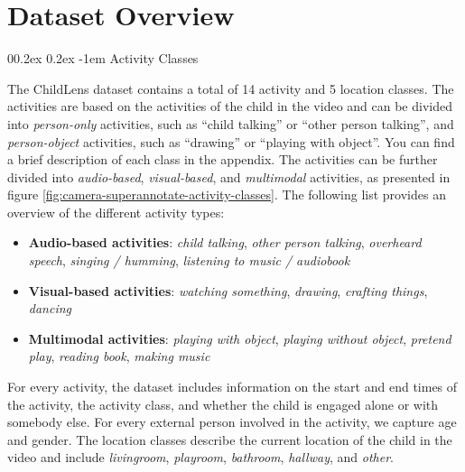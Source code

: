 \documentclass[
  man,floatsintext]{apa6}
\makeatletter
\providecommand{\tightlist}{%
  \setlength{\itemsep}{0pt}\setlength{\parskip}{0pt}}
\let\oldparagraph\paragraph
\renewcommand{\paragraph}{
    \@ifstar
      \xxxParagraphStar
      \xxxParagraphNoStar
  }
\newcommand{\xxxParagraphStar}[1]{\oldparagraph*{#1}\mbox{}}
\newcommand{\xxxParagraphNoStar}[1]{\oldparagraph{#1}\mbox{}}
\renewcommand{\paragraph}{\@startsection{paragraph}{4}{\parindent}%
  {0\baselineskip \@plus 0.2ex \@minus 0.2ex}%
  {-1em}%
  {\normalfont\normalsize\bfseries\itshape\typesectitle}}
\makeatother
\begin{document}
\section{Dataset Overview}\label{dataset-overview}

\paragraph{Activity Classes}\label{activity-classes}

The ChildLens dataset contains a total of 14 activity and 5 location classes. The activities are based on the activities of the child in the video and can be divided into \emph{person-only} activities, such as ``child talking'' or ``other person talking'', and \emph{person-object} activities, such as ``drawing'' or ``playing with object''. You can find a brief description of each class in the appendix. The activities can be further divided into \emph{audio-based}, \emph{visual-based}, and \emph{multimodal} activities, as presented in figure \ref{fig:camera-superannotate-activity-classes}. The following list provides an overview of the different activity types:

\begin{itemize}
\tightlist
\item
  \textbf{Audio-based activities}: \emph{child talking}, \emph{other person talking}, \emph{overheard speech}, \emph{singing / humming}, \emph{listening to music / audiobook}
\item
  \textbf{Visual-based activities}: \emph{watching something}, \emph{drawing}, \emph{crafting things}, \emph{dancing}
\item
  \textbf{Multimodal activities}: \emph{playing with object}, \emph{playing without object}, \emph{pretend play}, \emph{reading book}, \emph{making music}
\end{itemize}

For every activity, the dataset includes information on the start and end times of the activity, the activity class, and whether the child is engaged alone or with somebody else. For every external person involved in the activity, we capture age and gender. The location classes describe the current location of the child in the video and include \emph{livingroom}, \emph{playroom}, \emph{bathroom}, \emph{hallway}, and \emph{other}.
\end{document}
